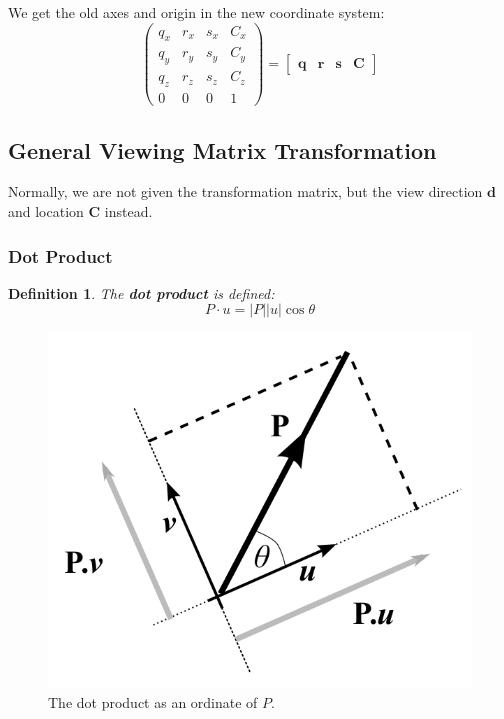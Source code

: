 \documentclass[11pt]{article}
\newtheorem{defn}{Definition}
\begin{document}
We get the old axes and origin in the new coordinate system:
\[
  \begin{pmatrix}
    q_x & r_x & s_x & C_x \\
    q_y & r_y & s_y & C_y \\
    q_z & r_z & s_z & C_z \\
    0 & 0 & 0 & 1
  \end{pmatrix}
  =
  \begin{bmatrix} \textbf{q} & \textbf{r} & \textbf{s} & \textbf{C} \end{bmatrix}
\]

\subsection{General Viewing Matrix Transformation}
Normally, we are not given the transformation matrix, but the view direction $\textbf{d}$ and location $\textbf{C}$ instead.

\subsubsection{Dot Product}
\begin{defn}
  The \textbf{dot product} is defined:
  \[
    P \cdot u = \lvert P \rvert \lvert u \rvert \cos \theta  
  \]
\end{defn}

\begin{figure}[htb!]
  \caption{The dot product as an ordinate of $P$.}
  \includegraphics[scale=0.2]{dotproduct}
  \centering
\end{figure}
\end{document}
